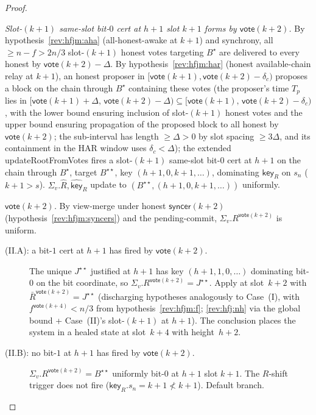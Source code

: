 \ifx\litemode\undefined\documentclass{article}\fi
\newcommand{\key}{\mathsf{key}}
\newcommand{\syncer}{\mathsf{syncer}}
\newcommand{\vote}{\mathsf{vote}}
\newcommand{\comm}[1]{\bar{#1}}
\newcommand{\updateRootFromVotes}{\textsf{updateRootFromVotes}\xspace}
\theoremstyle{plain}
\theoremstyle{definition}
\theoremstyle{remark}
\newcommand{\HAR}{honest available-chain relay\xspace}
\newcommand{\AHA}{all-honest-awake\xspace}
\begin{document}
\begin{proof}
\begin{description}
\emph{Slot-$(k+1)$ same-slot bit-$0$ cert at $h+1$ slot $k+1$ forms by $\vote(k+2)$.}
By hypothesis~\ref{rev:hfjm:aha} (\AHA at $k+1$) and synchrony, all $\geq n - f > 2n/3$ slot-$(k+1)$ honest votes targeting $B^\star$ are delivered to every honest by $\vote(k+2) - \Delta$. By hypothesis~\ref{rev:hfjm:har} (\HAR at $k+1$), an honest proposer in $[\vote(k+1), \vote(k+2) - \delta_c)$ proposes a block on the chain through $B^\star$ containing these votes (the proposer's time $T_p$ lies in $[\vote(k+1) + \Delta,\, \vote(k+2) - \Delta) \subseteq [\vote(k+1),\, \vote(k+2) - \delta_c)$, with the lower bound ensuring inclusion of slot-$(k+1)$ honest votes and the upper bound ensuring propagation of the proposed block to all honest by $\vote(k+2)$; the sub-interval has length $\geq \Delta > 0$ by slot spacing $\geq 3\Delta$, and its containment in the HAR window uses $\delta_c < \Delta$); the extended \updateRootFromVotes{} fires a slot-$(k+1)$ same-slot bit-$0$ cert at $h+1$ on the chain through $B^\star$, target $B^{\star\star}$, key $(h+1, 0, k+1, \ldots)$, dominating $\key_R$ on $s_n$ ($k+1 > s$). $\Sigma_v.\hat{R}, \hat{\key}_R$ update to $(B^{\star\star}, (h+1, 0, k+1, \ldots))$ uniformly.

\emph{$\vote(k+2)$.}
By view-merge under honest $\syncer(k+2)$ (hypothesis~\ref{rev:hfjm:syncers}) and the pending-commit, $\Sigma_v.R^{\vote(k+2)}$ is uniform.

\begin{description}
\item[{(II.A): a bit-$1$ cert at $h+1$ has fired by $\vote(k+2)$.}]\hfill

The unique $J^{\star\star}$ justified at $h+1$ has key $(h+1, 1, 0, \ldots)$ dominating bit-$0$ on the bit coordinate, so $\Sigma_v.R^{\vote(k+2)} = J^{\star\star}$. Apply  at slot~$k+2$ with $\comm{R}^{\vote(k+2)} = J^{\star\star}$ (discharging hypotheses analogously to Case~(I), with $f^{\vote(k+4)} < n/3$ from hypothesis~\ref{rev:hfjm:f}; \ref{rev:hfj:nh} via the global bound + Case~(II)'s slot-$(k+1)$ at $h+1$). The conclusion places the system in a healed state at slot~$k+4$ with height~$h+2$.

\item[{(II.B): no bit-$1$ at $h+1$ has fired by $\vote(k+2)$.}]\hfill

$\Sigma_v.R^{\vote(k+2)} = B^{\star\star}$ uniformly bit-$0$ at $h+1$ slot $k+1$. The $R$-shift trigger does not fire ($\key_R.s_n = k+1 \not< k+1$). Default branch.


\end{description}
\end{description}
\end{proof}
\end{document}
